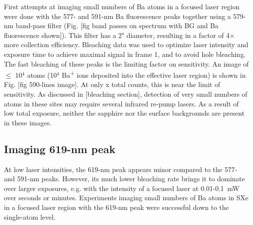 First attempts at imaging small numbers of Ba atoms in a focused laser region were done with the 577- and 591-nm Ba fluorescence peaks together using a {\color{red}579-nm} band-pass filter (Fig. [fig band passes on spectrum with BG and Ba fluorescence shown]).  This filter has a 2" diameter, resulting in a factor of 4$\times$ more collection efficiency.  Bleaching data was used to optimize laser intensity and exposure time to achieve maximal signal in frame 1, and to avoid hole bleaching.  The fast bleaching of these peaks is the limiting factor on sensitivity.  An image of $\leq$ 10$^{4}$ atoms (10$^{4}$ Ba\textsuperscript{+} ions deposited into the effective laser region) is shown in Fig. [fig 590-lines image].  At only x total counts, this is near the limit of sensitivity.  As discussed in [bleaching section], detection of very small numbers of atoms in these sites may require several infrared re-pump lasers.  As a result of low total exposure, neither the sapphire nor the surface backgrounds are present in these images.

\subsection{Imaging 619-nm peak}

At low laser intensities, the 619-nm peak appears minor compared to the 577- and 591-nm peaks.  However, its much lower bleaching rate brings it to dominate over larger exposures, e.g. with the intensity of a focused laser at 0.01-0.1~mW over seconds or minutes.  Experiments imaging small numbers of Ba atoms in SXe in a focused laser region with the 619-nm peak were successful down to the single-atom level.

